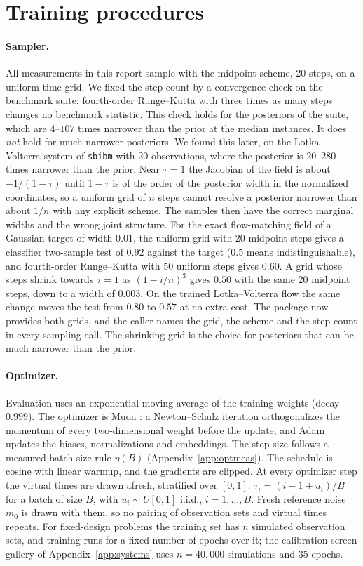 \documentclass[10pt]{article}
\begin{document}
\section{Training procedures}
\label{sec:recipe}

\paragraph{Sampler.} All measurements in this report sample with the midpoint scheme, 20 steps, on a
uniform time grid. We fixed the step count by a convergence check on the benchmark suite: fourth-order
Runge--Kutta with three times as many steps changes no benchmark statistic. This check holds for the
posteriors of the suite, which are $4$--$107$ times narrower than the prior at the median instances.
It does \emph{not} hold for much narrower posteriors. We found this later, on the Lotka--Volterra
system of \texttt{sbibm} with 20 observations, where the posterior is $20$--$280$ times narrower than
the prior. Near $\tau = 1$ the Jacobian of the field is about $-1/(1-\tau)$ until $1 - \tau$ is of the
order of the posterior width in the normalized coordinates, so a uniform grid of $n$ steps cannot
resolve a posterior narrower than about $1/n$ with any explicit scheme. The samples then have the
correct marginal widths and the wrong joint structure. For the exact flow-matching field of a Gaussian
target of width $0.01$, the uniform grid with 20 midpoint steps gives a classifier two-sample test of
$0.92$ against the target ($0.5$ means indistinguishable), and fourth-order Runge--Kutta with 50
uniform steps gives $0.60$. A grid whose steps shrink towards $\tau = 1$ as $(1 - i/n)^3$ gives $0.50$
with the same 20 midpoint steps, down to a width of $0.003$. On the trained Lotka--Volterra flow the
same change moves the test from $0.80$ to $0.57$ at no extra cost. The package now provides both
grids, and the caller names the grid, the scheme and the step count in every sampling call. The
shrinking grid is the choice for posteriors that can be much narrower than the prior.

\paragraph{Optimizer.} Evaluation uses an exponential moving average of the training weights (decay
$0.999$). The optimizer is Muon \citep{jordan2024}: a Newton--Schulz iteration orthogonalizes the
momentum of every two-dimensional weight before the update, and Adam updates the biases,
normalizations and embeddings. The step size follows a measured batch-size rule $\eta(B)$
(Appendix~\ref{app:optmeas}). The schedule is cosine with linear warmup, and the gradients are clipped.
At every optimizer step the virtual times are drawn afresh, stratified over $[0,1]$:
$\tau_i = (i - 1 + u_i)/B$ for a batch of size $B$, with $u_i \sim U[0,1]$ i.i.d., $i = 1, \dots, B$.
Fresh reference noise $m_0$ is drawn with them, so no pairing of observation sets and virtual times
repeats. For fixed-design problems the training set has $n$ simulated observation sets, and training
runs for a fixed number of epochs over it; the calibration-screen gallery of
Appendix~\ref{app:systems} uses $n = 40{,}000$ simulations and 35 epochs.
\end{document}
